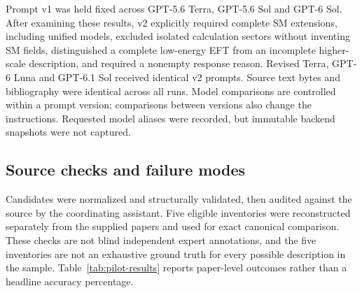 Prompt v1 was held fixed across GPT-5.6 Terra, GPT-5.6 Sol and GPT-6 Sol. After examining these results, v2 explicitly required complete SM extensions, including unified models, excluded isolated calculation sectors without inventing SM fields, distinguished a complete low-energy EFT from an incomplete higher-scale description, and required a nonempty response reason. Revised Terra, GPT-6 Luna and GPT-6.1 Sol received identical v2 prompts. Source text bytes and bibliography were identical across all \PilotRuns{} runs. Model comparisons are controlled within a prompt version; comparisons between versions also change the instructions. Requested model aliases were recorded, but immutable backend snapshots were not captured.

\subsection{Source checks and failure modes}

Candidates were normalized and structurally validated, then audited against the source by the coordinating assistant. Five eligible inventories were reconstructed separately from the supplied papers and used for exact canonical comparison. These checks are not blind independent expert annotations, and the five inventories are not an exhaustive ground truth for every possible description in the sample. Table~\ref{tab:pilot-results} reports paper-level outcomes rather than a headline accuracy percentage.


